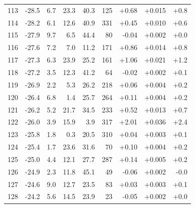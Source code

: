 \begin{longtable}{@{}r r r r r r r r r@{}}
113 & -28.5 & 6.7 & 23.3 & 40.3 & 125 & \cellcolor{green!21}+0.68 & \cellcolor{yellow!21}+0.015 & \cellcolor{orange!19}+0.8 \\
114 & -28.2 & 6.1 & 12.6 & 40.9 & 331 & \cellcolor{green!19}+0.45 & \cellcolor{yellow!19}+0.010 & \cellcolor{orange!18}+0.6 \\
115 & -27.9 & 9.7 & 6.5 & 44.4 & 80 & \cellcolor{green!15}-0.04 & \cellcolor{yellow!15}+0.002 & \cellcolor{orange!15}+0.0 \\
116 & -27.6 & 7.2 & 7.0 & 11.2 & 171 & \cellcolor{green!22}+0.86 & \cellcolor{yellow!21}+0.014 & \cellcolor{orange!19}+0.8 \\
117 & -27.3 & 6.3 & 23.9 & 25.2 & 161 & \cellcolor{green!24}+1.06 & \cellcolor{yellow!24}+0.021 & \cellcolor{orange!21}+1.2 \\
118 & -27.2 & 3.5 & 12.3 & 41.2 & 64 & \cellcolor{green!15}-0.02 & \cellcolor{yellow!15}+0.002 & \cellcolor{orange!15}+0.1 \\
119 & -26.9 & 2.2 & 5.3 & 26.2 & 218 & \cellcolor{green!16}+0.06 & \cellcolor{yellow!16}+0.004 & \cellcolor{orange!16}+0.2 \\
120 & -26.4 & 6.8 & 1.4 & 25.7 & 264 & \cellcolor{green!16}+0.11 & \cellcolor{yellow!16}+0.004 & \cellcolor{orange!16}+0.2 \\
121 & -26.2 & 5.2 & 21.7 & 34.5 & 233 & \cellcolor{green!20}+0.52 & \cellcolor{yellow!20}+0.013 & \cellcolor{orange!19}+0.7 \\
122 & -26.0 & 3.9 & 15.9 & 3.9 & 317 & \cellcolor{green!31}+2.01 & \cellcolor{yellow!31}+0.036 & \cellcolor{orange!27}+2.4 \\
123 & -25.8 & 1.8 & 0.3 & 20.5 & 310 & \cellcolor{green!16}+0.04 & \cellcolor{yellow!16}+0.003 & \cellcolor{orange!16}+0.1 \\
124 & -25.4 & 1.7 & 23.6 & 31.6 & 70 & \cellcolor{green!16}+0.10 & \cellcolor{yellow!16}+0.004 & \cellcolor{orange!16}+0.2 \\
125 & -25.0 & 4.4 & 12.1 & 27.7 & 287 & \cellcolor{green!17}+0.14 & \cellcolor{yellow!17}+0.005 & \cellcolor{orange!16}+0.2 \\
126 & -24.9 & 2.3 & 11.8 & 45.1 & 49 & \cellcolor{green!15}-0.06 & \cellcolor{yellow!15}+0.002 & \cellcolor{orange!15}-0.0 \\
127 & -24.6 & 9.0 & 12.7 & 23.5 & 83 & \cellcolor{green!16}+0.03 & \cellcolor{yellow!15}+0.003 & \cellcolor{orange!16}+0.1 \\
128 & -24.2 & 5.6 & 14.5 & 23.9 & 23 & \cellcolor{green!15}-0.05 & \cellcolor{yellow!15}+0.002 & \cellcolor{orange!15}+0.0 \\

\end{longtable}
